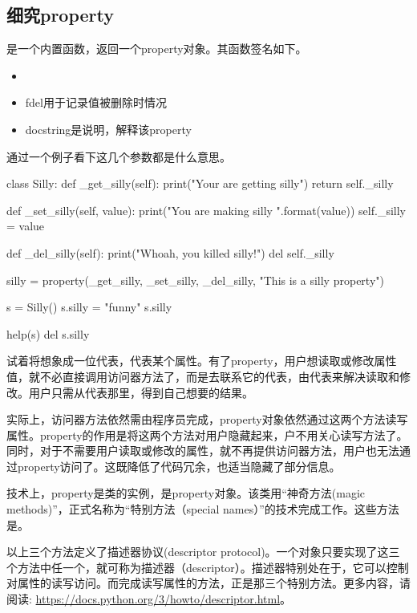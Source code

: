 \subsection{细究property}

是一个内置函数，返回一个property对象。其函数签名如下。
\begin{itemize}
\item {}
\item fdel用于记录值被删除时情况
\item docstring是说明，解释该property
\end{itemize}
通过一个例子看下这几个参数都是什么意思。
\begin{python}
class Silly:
    def _get_silly(self):
        print("Your are getting silly")
        return self._silly

    def _set_silly(self, value):
        print("You are making silly {}".format(value))
        self._silly = value

    def _del_silly(self):
        print("Whoah, you killed silly!")
        del self._silly

    silly = property(_get_silly, _set_silly, _del_silly, "This is a silly property")

s = Silly()
s.silly = "funny"
s.silly

help(s)
del s.silly
\end{python}
试着将想象成一位代表，代表某个属性。有了property，用户想读取或修改属性值，就不必直接调用访问器方法了，而是去联系它的代表，由代表来解决读取和修改。用户只需从代表那里，得到自己想要的结果。

实际上，访问器方法依然需由程序员完成，property对象依然通过这两个方法读写属性。property的作用是将这两个方法对用户隐藏起来，户不用关心读写方法了。同时，对于不需要用户读取或修改的属性，就不再提供访问器方法，用户也无法通过property访问了。这既降低了代码冗余，也适当隐藏了部分信息。

技术上，property是类的实例，是property对象。该类用“神奇方法(magic methods)”，正式名称为“特别方法（special names）”的技术完成工作。这些方法是。

以上三个方法定义了描述器协议(descriptor protocol)。一个对象只要实现了这三个方法中任一个，就可称为描述器（descriptor）。描述器特别处在于，它可以控制对属性的读写访问。而完成读写属性的方法，正是那三个特别方法。更多内容，请阅读: \url{https://docs.python.org/3/howto/descriptor.html}。

